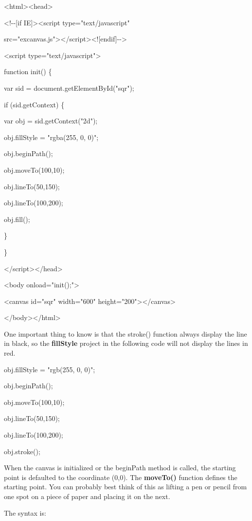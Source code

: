 \documentclass[
]{article}
\begin{document}
\textless html\textgreater\textless head\textgreater{}

\textless!-\/-{[}if IE{]}\textgreater\textless script
type="text/javascript"

src="excanvas.js"\textgreater\textless/script\textgreater\textless!{[}endif{]}-\/-\textgreater{}

\textless script type="text/javascript"\textgreater{}

function init() \{

var sid = document.getElementById("sqr");

if (sid.getContext) \{

var obj = sid.getContext("2d");

obj.fillStyle = "rgba(255, 0, 0)";

obj.beginPath();

obj.moveTo(100,10);

obj.lineTo(50,150);

obj.lineTo(100,200);

obj.fill();

\}

\}

\textless/script\textgreater\textless/head\textgreater{}

\textless body onload="init();"\textgreater{}

\textless canvas id="sqr" width="600"
height="200"\textgreater\textless/canvas\textgreater{}

\textless/body\textgreater\textless/html\textgreater{}

One important thing to know is that the stroke() function always display
the line in black, so the \textbf{fillStyle} project in the following
code will not display the lines in red.

obj.fillStyle = "rgb(255, 0, 0)";

obj.beginPath();

obj.moveTo(100,10);

obj.lineTo(50,150);

obj.lineTo(100,200);

obj.stroke();

When the canvas is initialized or the beginPath method is called, the
starting point is defaulted to the coordinate (0,0). The
\textbf{moveTo()} function defines the starting point. You can probably
best think of this as lifting a pen or pencil from one spot on a piece
of paper and placing it on the next.

The syntax is:
\end{document}
